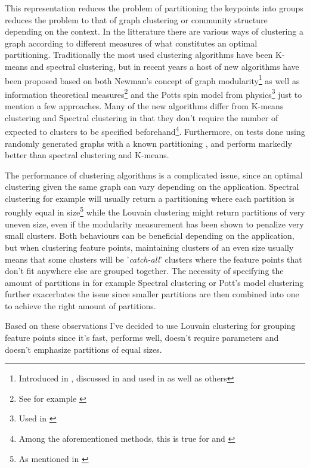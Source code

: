 \documentclass{article}
\begin{document}
This representation reduces the problem of partitioning the keypoints 
into groups reduces the problem to that of graph clustering or community 
structure depending on the context. In the litterature there are various 
ways of clustering a graph according to different measures of what 
constitutes an optimal partitioning. Traditionally the most used 
clustering algorithms have been K-means and spectral clustering, but in 
recent years a host of new algorithms have been proposed based on both 
Newman's concept of graph modularity\footnote{Introduced in 
\cite{girvan2002}, discussed in \cite{brandes2007} and used in 
\cite{blondel2008} as well as others} as well as information theoretical 
measures\footnote{See for example \cite{rosvall2008}} and the Potts spin 
model from physics\footnote{Used in \cite{ronhovde2009}} just to mention 
a few approaches. Many of the new algorithms differ from K-means 
clustering and Spectral clustering in that they don't require the number 
of expected to clusters to be specified beforehand\footnote{Among the 
aforementioned methods, this is true for \cite{blondel2008} and 
\cite{rosvall2008}}.  Furthermore, on tests done using randomly 
generated graphs with a known partitioning \cite{blondel2008}, 
\cite{rosvall2008} and \cite{ronhovde2009} perform markedly better than 
spectral clustering and K-means\cite{lancichinetti2009}.

The performance of clustering algorithms is a complicated issue, since 
an optimal clustering given the same graph can vary depending on the 
application. Spectral clustering for example will usually return a 
partitioning where each partition is roughly equal in size\footnote{As 
mentioned in \cite{von2007}} while the Louvain 
clustering\cite{blondel2008} might return partitions of very uneven 
size, even if the modularity measurement has been shown to penalize very 
small clusters\cite{brandes2007}. Both behaviours can be beneficial 
depending on the application, but when clustering feature points, 
maintaining clusters of an even size usually means that some clusters 
will be '\emph{catch-all}' clusters where the feature points that don't 
fit anywhere else are grouped together. The necessity of specifying the 
amount of partitions in for example Spectral clustering or Pott's model 
clustering further exacerbates the issue since smaller partitions are 
then combined into one to achieve the right amount of partitions.

Based on these observations I've decided to use Louvain clustering for 
grouping feature points since it's fast, performs well, doesn't require 
parameters and doesn't emphasize partitions of equal sizes.
\end{document}
